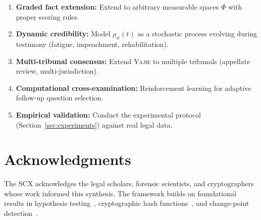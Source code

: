 \documentclass[11pt,a4paper]{article}
\theoremstyle{definition}
\newcommand{\Yajie}{\textsc{Yajie}}
\begin{document}
\begin{enumerate}[label=(\roman*)]
    \item \textbf{Graded fact extension:} Extend to arbitrary measurable spaces $\Phi$ with proper scoring rules.
    \item \textbf{Dynamic credibility:} Model $\rho_w(t)$ as a stochastic process evolving during testimony (fatigue, impeachment, rehabilitation).
    \item \textbf{Multi-tribunal consensus:} Extend \Yajie{} to multiple tribunals (appellate review, multi-jurisdiction).
    \item \textbf{Computational cross-examination:} Reinforcement learning for adaptive follow-up question selection.
    \item \textbf{Empirical validation:} Conduct the experimental protocol (Section~\ref{sec:experiments}) against real legal data.
\end{enumerate}

\section*{Acknowledgments}
The SCX acknowledges the legal scholars, forensic scientists, and cryptographers whose work informed this synthesis. The framework builds on foundational results in hypothesis testing~\cite{Hoeffding1963}, cryptographic hash functions~\cite{Merkle1980}, and change-point detection~\cite{Page1954}.
\end{document}
